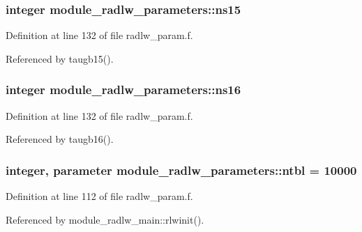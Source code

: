 \subsubsection[{\texorpdfstring{ns15}{ns15}}]{\setlength{\rightskip}{0pt plus 5cm}integer module\+\_\+radlw\+\_\+parameters\+::ns15}\hypertarget{namespacemodule__radlw__parameters_a9662e6bd344b1dbbfa7cc4429753bb10}{}\label{namespacemodule__radlw__parameters_a9662e6bd344b1dbbfa7cc4429753bb10}


Definition at line 132 of file radlw\+\_\+param.\+f.



Referenced by taugb15().

\subsubsection[{\texorpdfstring{ns16}{ns16}}]{\setlength{\rightskip}{0pt plus 5cm}integer module\+\_\+radlw\+\_\+parameters\+::ns16}\hypertarget{namespacemodule__radlw__parameters_a3a7ba0b8f35271e7979deea86f834479}{}\label{namespacemodule__radlw__parameters_a3a7ba0b8f35271e7979deea86f834479}


Definition at line 132 of file radlw\+\_\+param.\+f.



Referenced by taugb16().

\subsubsection[{\texorpdfstring{ntbl}{ntbl}}]{\setlength{\rightskip}{0pt plus 5cm}integer, parameter module\+\_\+radlw\+\_\+parameters\+::ntbl = 10000}\hypertarget{namespacemodule__radlw__parameters_a61ae33b9db5bac9962f72e2a0db3c0e4}{}\label{namespacemodule__radlw__parameters_a61ae33b9db5bac9962f72e2a0db3c0e4}


Definition at line 112 of file radlw\+\_\+param.\+f.



Referenced by module\+\_\+radlw\+\_\+main\+::rlwinit().

